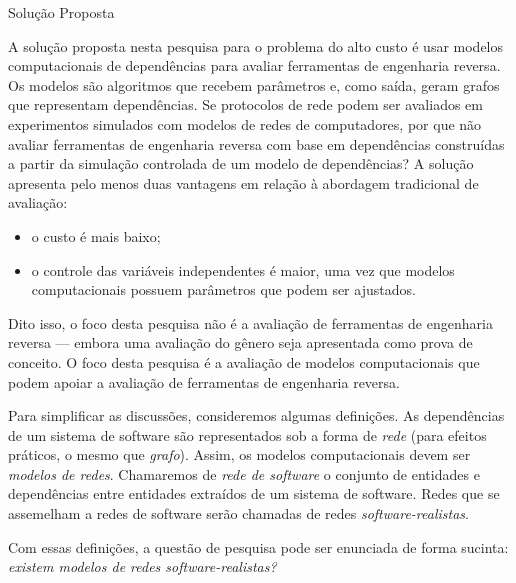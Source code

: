 \begin{section}{Solução Proposta}
	
	
	A solução proposta nesta pesquisa para o problema do alto custo é usar modelos computacionais de dependências para avaliar ferramentas de engenharia reversa. Os modelos são algoritmos que recebem parâmetros e, como saída, geram grafos que representam dependências. Se protocolos de rede podem ser avaliados em experimentos simulados com modelos de redes de computadores, por que não avaliar ferramentas de engenharia reversa com base em dependências construídas a partir da simulação controlada de um modelo de dependências? A solução apresenta pelo menos duas vantagens em relação à abordagem tradicional de avaliação: 
	
	\begin{itemize}
		\item o custo é mais baixo;
		\item o controle das variáveis independentes é maior, uma vez que modelos computacionais possuem parâmetros que podem ser ajustados.
	\end{itemize}

	Dito isso, o foco desta pesquisa não é a avaliação de ferramentas de engenharia reversa --- embora uma avaliação do gênero seja apresentada como prova de conceito. O foco desta pesquisa é a avaliação de modelos computacionais que podem apoiar a avaliação de ferramentas de engenharia reversa. 
	
	Para simplificar as discussões, consideremos algumas definições. As dependências de um sistema de software são representados sob a forma de \emph{rede} (para efeitos práticos, o mesmo que \emph{grafo}). Assim, os modelos computacionais devem ser \emph{modelos de redes}. Chamaremos de \emph{rede de software} o conjunto de entidades e dependências entre entidades extraídos de um sistema de software. Redes que se assemelham a redes de software serão chamadas de redes \emph{software-realistas}.
	
	Com essas definições, a questão de pesquisa pode ser enunciada de forma sucinta: \emph{existem modelos de redes software-realistas?}
	
	
\end{section}

